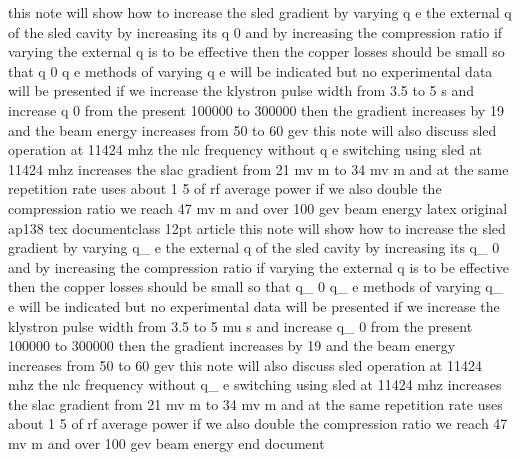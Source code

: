 this note will show how to increase the sled gradient by varying q e the external q of the sled cavity by increasing its q 0 and by increasing the compression ratio if varying the external q is to be effective then the copper losses should be small so that q 0 q e methods of varying q e will be indicated but no experimental data will be presented if we increase the klystron pulse width from 3.5 to 5  s and increase q 0 from the present 100000 to 300000 then the gradient increases by 19 and the beam energy increases from 50 to 60 gev this note will also discuss sled operation at 11424 mhz the nlc frequency without q e switching using sled at 11424 mhz increases the slac gradient from 21 mv m to 34 mv m and at the same repetition rate uses about 1 5 of rf average power if we also double the compression ratio we reach 47 mv m and over 100 gev beam energy latex original ap138 tex documentclass 12pt article this note will show how to increase the sled gradient by varying q_ e the external q of the sled cavity by increasing its q_ 0 and by increasing the compression ratio if varying the external q is to be effective then the copper losses should be small so that q_ 0 q_ e methods of varying q_ e will be indicated but no experimental data will be presented if we increase the klystron pulse width from 3.5 to 5 mu s and increase q_ 0 from the present 100000 to 300000 then the gradient increases by 19 and the beam energy increases from 50 to 60 gev this note will also discuss sled operation at 11424 mhz the nlc frequency without q_ e switching using sled at 11424 mhz increases the slac gradient from 21 mv m to 34 mv m and at the same repetition rate uses about 1 5 of rf average power if we also double the compression ratio we reach 47 mv m and over 100 gev beam energy end document
